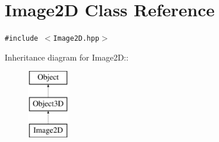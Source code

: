 \hypertarget{classm3g_1_1Image2D}{
\section{Image2D Class Reference}
\label{classm3g_1_1Image2D}
}
{\tt \#include $<$Image2D.hpp$>$}

Inheritance diagram for Image2D::\begin{figure}[H]
\begin{center}
\leavevmode
\includegraphics[height=3cm]{classm3g_1_1Image2D}
\end{center}
\end{figure}
